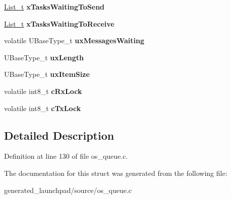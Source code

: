 \begin{DoxyCompactItemize}
\begin{tabbing}
\end{tabbing}\item 
\mbox{\label{structQueueDefinition_aaab135c4345cb0393d6ff3cd5164c7b2}} 
\mbox{\hyperlink{structxLIST}{List\+\_\+t}} {\bfseries x\+Tasks\+Waiting\+To\+Send}
\item 
\mbox{\label{structQueueDefinition_af6d61526f77beee659cd604a0c473359}} 
\mbox{\hyperlink{structxLIST}{List\+\_\+t}} {\bfseries x\+Tasks\+Waiting\+To\+Receive}
\item 
\mbox{\label{structQueueDefinition_a12b07a40152d0f21488ca06d362d13d1}} 
volatile U\+Base\+Type\+\_\+t {\bfseries ux\+Messages\+Waiting}
\item 
\mbox{\label{structQueueDefinition_ae80d17a812c669d4d41265b7f693988c}} 
U\+Base\+Type\+\_\+t {\bfseries ux\+Length}
\item 
\mbox{\label{structQueueDefinition_a81bb7d3826909244baa9debf5a55abb0}} 
U\+Base\+Type\+\_\+t {\bfseries ux\+Item\+Size}
\item 
\mbox{\label{structQueueDefinition_ac750a3f75a6e174adbc697e473a0dd13}} 
volatile int8\+\_\+t {\bfseries c\+Rx\+Lock}
\item 
\mbox{\label{structQueueDefinition_a24ac3f0707f098da2a22244d843fcf82}} 
volatile int8\+\_\+t {\bfseries c\+Tx\+Lock}
\end{DoxyCompactItemize}


\subsection{Detailed Description}


Definition at line 130 of file os\+\_\+queue.\+c.



The documentation for this struct was generated from the following file\+:\begin{DoxyCompactItemize}
\item 
generated\+\_\+launchpad/source/os\+\_\+queue.\+c\end{DoxyCompactItemize}
